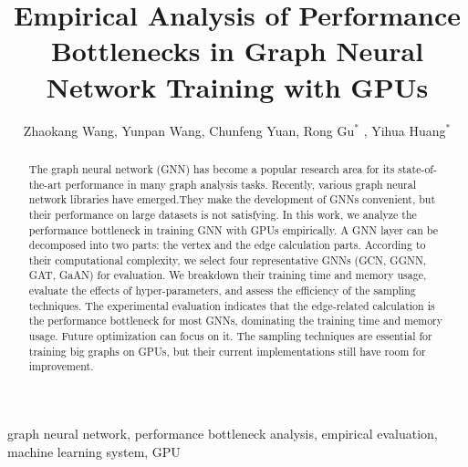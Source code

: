 \documentclass{elsarticle}
\begin{document}
\begin{frontmatter}

	\title{Empirical Analysis of Performance Bottlenecks in Graph Neural Network Training with GPUs}
    \author{Zhaokang Wang, Yunpan Wang, Chunfeng Yuan, Rong Gu$^*$ , Yihua Huang$^*$ }
	\address{State Key Laboratory for Novel Software Technology, \\Department of Computer Science and Technology, Nanjing University, \\Nanjing 210023, China}

	\begin{abstract}
		The graph neural network (GNN) has become a popular research area for its state-of-the-art performance in many graph analysis tasks. 
		Recently, various graph neural network libraries have emerged.They make the development of GNNs convenient, but their performance on large datasets is not satisfying. 
		In this work, we analyze the performance bottleneck in training GNN with GPUs empirically. 
		A GNN layer can be decomposed into two parts: the vertex and the edge calculation parts. 
		According to their computational complexity, we select four representative GNNs (GCN, GGNN, GAT, GaAN) for evaluation. 
		We breakdown their training time and memory usage, evaluate the effects of hyper-parameters, and assess the efficiency of the sampling techniques.
		The experimental evaluation indicates that the edge-related calculation is the performance bottleneck for most GNNs, dominating the training time and memory usage.
		Future optimization can focus on it. The sampling techniques are essential for training big graphs on GPUs, but their current implementations still have room for improvement.
	\end{abstract}

	\begin{keyword}
		graph neural network, performance bottleneck analysis, empirical evaluation, machine learning system, GPU
	\end{keyword}

\end{frontmatter}

\linenumbers










\end{document}
